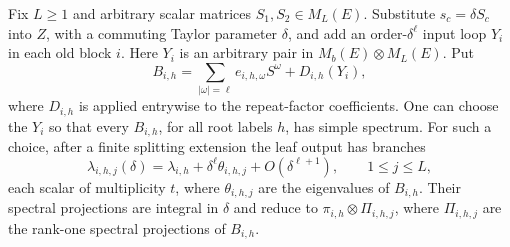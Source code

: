 \begin{lemma}
\label{lem:repeated-splitting}
Fix \(L\geq1\) and arbitrary scalar matrices
\(S_1,S_2\in M_L(E)\). Substitute \(s_c=\delta S_c\) into
\(Z\), with a commuting Taylor parameter \(\delta\), and add
an order-\(\delta^\ell\) input loop \(Y_i\) in each old block
\(i\). Here \(Y_i\) is an arbitrary pair in
\(M_b(E)\otimes M_L(E)\). Put
\[
 B_{i,h}=\sum_{|\omega|=\ell}
 e_{i,h,\omega}S^\omega+D_{i,h}(Y_i),
\]
where \(D_{i,h}\) is applied entrywise to the repeat-factor
coefficients. One can choose the \(Y_i\) so that every \(B_{i,h}\),
for all root labels \(h\), has simple spectrum. For such a choice,
after a finite splitting extension the leaf output has branches
\[
 \lambda_{i,h,j}(\delta)
 =\lambda_{i,h}+\delta^\ell\theta_{i,h,j}
    +O(\delta^{\ell+1}),\qquad 1\leq j\leq L,
\]
each scalar of multiplicity \(t\), where \(\theta_{i,h,j}\)
are the eigenvalues of \(B_{i,h}\). Their spectral projections
are integral in \(\delta\) and reduce to
\(\pi_{i,h}\otimes\Pi_{i,h,j}\), where
\(\Pi_{i,h,j}\) are the rank-one spectral projections of
\(B_{i,h}\).
\end{lemma}

